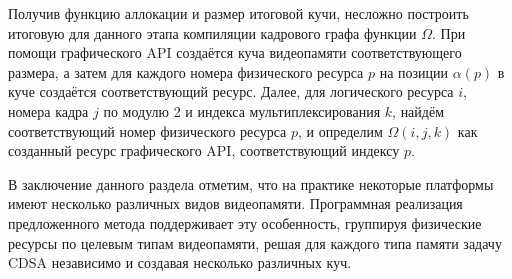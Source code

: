 Получив функцию аллокации и размер итоговой кучи, несложно построить итоговую для данного этапа компиляции кадрового графа функции $\Omega$.
При помощи графического API создаётся куча видеопамяти соответствующего размера, а затем для каждого номера физического ресурса $p$ на позиции $\alpha(p)$ в куче создаётся соответствующий ресурс.
Далее, для логического ресурса $i$, номера кадра $j$ по модулю 2 и индекса мультиплексирования $k$, найдём соответствующий номер физического ресурса $p$, и определим $\Omega(i, j, k)$ как созданный ресурс графического API, соответствующий индексу $p$.

В заключение данного раздела отметим, что на практике некоторые платформы имеют несколько различных видов видеопамяти.
Программная реализация предложенного метода поддерживает эту особенность, группируя физические ресурсы по целевым типам видеопамяти, решая для каждого типа памяти задачу CDSA независимо и создавая несколько различных куч.
